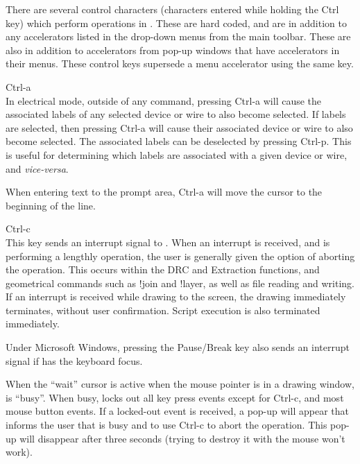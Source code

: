 There are several control characters (characters entered while holding
the {\kb Ctrl} key) which perform operations in {\Xic}.  These are
hard coded, and are in addition to any accelerators listed in the
drop-down menus from the main toolbar.  These are also in addition to
accelerators from pop-up windows that have accelerators in their
menus.  These control keys supersede a menu accelerator using the
same key.

\begin{description}
\item{\kb Ctrl-a}\\
In electrical mode, outside of any command, pressing {\kb Ctrl-a} will
cause the associated labels of any selected device or wire to also
become selected.  If labels are selected, then pressing {\kb Ctrl-a}
will cause their associated device or wire to also become selected. 
The associated labels can be deselected by pressing {\kb Ctrl-p}. 
This is useful for determining which labels are associated with a
given device or wire, and {\it vice-versa}.

When entering text to the prompt area, {\kb Ctrl-a} will move the
cursor to the beginning of the line.

\item{\kb Ctrl-c}\\
This key sends an interrupt signal to {\Xic}.  When an interrupt is
received, and {\Xic} is performing a lengthly operation, the user is
generally given the option of aborting the operation.  This occurs
within the DRC and Extraction functions, and geometrical commands such
as {\cb !join} and {\cb !layer}, as well as file reading and writing. 
If an interrupt is received while drawing to the screen, the drawing
immediately terminates, without user confirmation.  Script execution
is also terminated immediately.

Under Microsoft Windows, pressing the {\kb Pause/Break} key also sends
an interrupt signal if {\Xic} has the keyboard focus.

When the ``wait'' cursor is active when the mouse pointer is in a
drawing window, {\Xic} is ``busy''.  When busy, {\Xic} locks out all
key press events except for {\kb Ctrl-c}, and most mouse button
events.  If a locked-out event is received, a pop-up will appear that
informs the user that {\Xic} is busy and to use {\kb Ctrl-c} to abort
the operation.  This pop-up will disappear after three seconds (trying
to destroy it with the mouse won't work).


\end{description}
